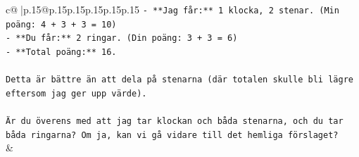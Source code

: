\documentclass{article}
\begin{document}
{\begin{supertabular}{c@{$\;$}|p{.15\linewidth}@{}p{.15\linewidth}p{.15\linewidth}p{.15\linewidth}p{.15\linewidth}p{.15\linewidth}}
{{{\texttt{{-} **Jag får:** 1 klocka, 2 stenar. (Min poäng: 4 + 3 + 3 = 10)} \\
\texttt{{-} **Du får:** 2 ringar. (Din poäng: 3 + 3 = 6)} \\
\texttt{{-} **Total poäng:** 16.} \\
\\ 
\texttt{Detta är bättre än att dela på stenarna (där totalen skulle bli lägre eftersom jag ger upp värde).} \\
\\ 
\texttt{Är du överens med att jag tar klockan och båda stenarna, och du tar båda ringarna? Om ja, kan vi gå vidare till det hemliga förslaget?} \\
            }
        }
    }
    & \\ \\


\end{supertabular}}
\end{document}
